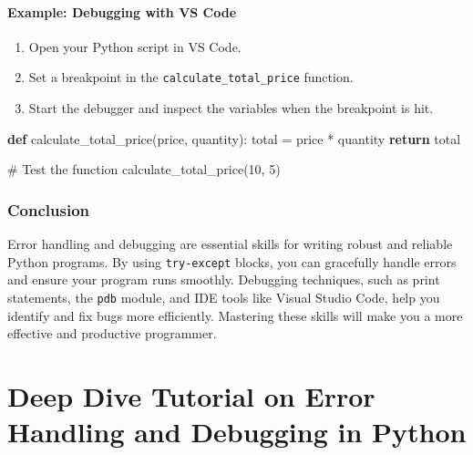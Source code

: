\documentclass[
  letterpaper,
  DIV=11,
  numbers=noendperiod]{scrreprt}
\newenvironment{Shaded}{\begin{snugshade}}{\end{snugshade}}
\newcommand{\CommentTok}[1]{\textcolor[rgb]{0.37,0.37,0.37}{#1}}
\newcommand{\ControlFlowTok}[1]{\textcolor[rgb]{0.00,0.23,0.31}{\textbf{#1}}}
\newcommand{\DecValTok}[1]{\textcolor[rgb]{0.68,0.00,0.00}{#1}}
\newcommand{\KeywordTok}[1]{\textcolor[rgb]{0.00,0.23,0.31}{\textbf{#1}}}
\newcommand{\NormalTok}[1]{\textcolor[rgb]{0.00,0.23,0.31}{#1}}
\newcommand{\OperatorTok}[1]{\textcolor[rgb]{0.37,0.37,0.37}{#1}}
\providecommand{\tightlist}{%
  \setlength{\itemsep}{0pt}\setlength{\parskip}{0pt}}\usepackage{longtable,booktabs,array}
\begin{document}
\subsubsection{Example: Debugging with VS
Code}\label{example-debugging-with-vs-code}

\begin{enumerate}
\def\labelenumi{\arabic{enumi}.}
\tightlist
\item
  Open your Python script in VS Code.
\item
  Set a breakpoint in the \texttt{calculate\_total\_price} function.
\item
  Start the debugger and inspect the variables when the breakpoint is
  hit.
\end{enumerate}

\begin{Shaded}
\begin{Highlighting}[]
\KeywordTok{def}\NormalTok{ calculate\_total\_price(price, quantity):}
\NormalTok{    total }\OperatorTok{=}\NormalTok{ price }\OperatorTok{*}\NormalTok{ quantity}
    \ControlFlowTok{return}\NormalTok{ total}

\CommentTok{\# Test the function}
\NormalTok{calculate\_total\_price(}\DecValTok{10}\NormalTok{, }\DecValTok{5}\NormalTok{)}
\end{Highlighting}
\end{Shaded}

\subsection{Conclusion}\label{conclusion-10}

Error handling and debugging are essential skills for writing robust and
reliable Python programs. By using \texttt{try-except} blocks, you can
gracefully handle errors and ensure your program runs smoothly.
Debugging techniques, such as print statements, the \texttt{pdb} module,
and IDE tools like Visual Studio Code, help you identify and fix bugs
more efficiently. Mastering these skills will make you a more effective
and productive programmer.


\chapter{Deep Dive Tutorial on Error Handling and Debugging in
Python}\label{deep-dive-tutorial-on-error-handling-and-debugging-in-python}
\end{document}
